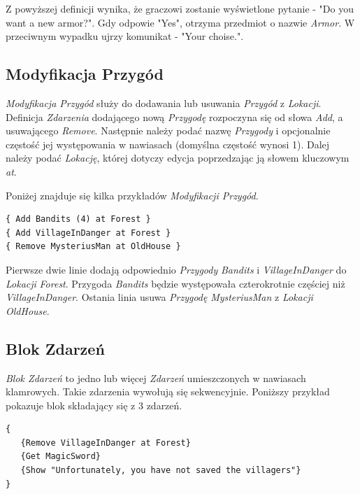 \documentclass[openright]{xmgr}
\begin{document}
Z powyższej definicji wynika, że graczowi zostanie wyświetlone pytanie - "Do you want a new armor?". Gdy odpowie "Yes", otrzyma przedmiot o nazwie \textit{Armor}. W przeciwnym wypadku ujrzy komunikat - "Your choise.".

\subsection*{Modyfikacja Przygód}
\textit{Modyfikacja Przygód} służy do dodawania lub usuwania \textit{Przygód} z \textit{Lokacji}. Definicja \textit{Zdarzenia} dodającego nową \textit{Przygodę} rozpoczyna się od słowa \textit{Add}, a usuwającego \textit{Remove}. Następnie należy podać nazwę \textit{Przygody} i opcjonalnie częstość jej występowania w nawiasach (domyślna częstość wynosi 1). Dalej należy podać \textit{Lokację}, której dotyczy edycja poprzedzając ją słowem kluczowym \textit{at}.

Poniżej znajduje się kilka przykładów \textit{Modyfikacji Przygód}. 
\begin{verbatim}
{ Add Bandits (4) at Forest }
{ Add VillageInDanger at Forest }
{ Remove MysteriusMan at OldHouse }
\end{verbatim}
Pierwsze dwie linie dodają odpowiednio \textit{Przygody} \textit{Bandits} i \textit{VillageInDanger} do \textit{Lokacji} \textit{Forest}. Przygoda \textit{Bandits} będzie występowała czterokrotnie częściej niż \textit{VillageInDanger}. Ostania linia usuwa \textit{Przygodę} \textit{MysteriusMan} z \textit{Lokacji} \textit{OldHouse}.

\subsection*{Blok Zdarzeń}
\textit{Blok Zdarzeń } to jedno lub więcej \textit{Zdarzeń} umieszczonych w nawiasach klamrowych. Takie zdarzenia wywołują się sekwencyjnie.
Poniższy przykład pokazuje blok składający się z 3 zdarzeń.
\begin{verbatim}
{
   {Remove VillageInDanger at Forest}
   {Get MagicSword}
   {Show "Unfortunately, you have not saved the villagers"}
}
\end{verbatim}
\end{document}
